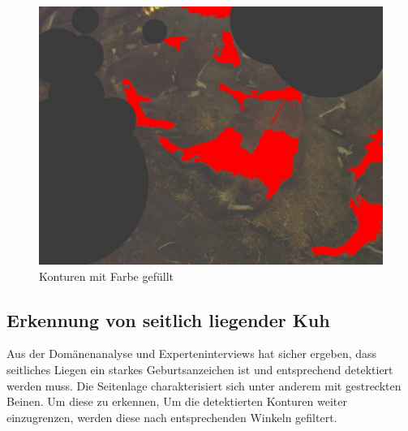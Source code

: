 \begin{figure}[H]
	\center
	\includegraphics[scale=0.43]{Grafiken/entwicklung/14AfterThresholdingContourFilled.jpg}
	\caption{Konturen mit Farbe gefüllt} 
	\label{fig: Konturen mit Farbe gefüllt} 
\end{figure}


\subsection{Erkennung von seitlich liegender Kuh}
Aus der Domänenanalyse und Experteninterviews hat sicher ergeben, dass seitliches Liegen ein starkes Geburtsanzeichen ist und entsprechend detektiert werden muss. Die Seitenlage charakterisiert sich unter anderem mit gestreckten Beinen. Um diese zu erkennen, 
Um die detektierten Konturen weiter einzugrenzen, werden diese nach entsprechenden Winkeln gefiltert. 


